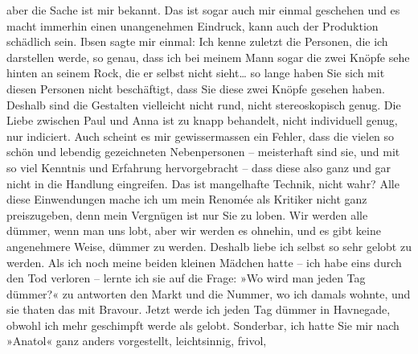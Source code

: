 \begin{ledgroupsized}[t]{13cm}
               aber die Sache ist mir bekannt. Das ist sogar auch mir einmal geschehen und es macht
               immerhin einen unangenehmen Eindruck, kann auch der Produktion schädlich sein. Ibsen sagte mir einmal: Ich kenne zuletzt die
               Personen, die ich darstellen werde, so genau, dass
               ich bei meinem Mann sogar die zwei Knöpfe sehe hinten an seinem Rock, die er selbst
               nicht sieht{\dots} so lange haben Sie sich mit diesen Personen
               nicht beschäftigt, dass Sie diese zwei Knöpfe gesehen haben. Deshalb sind die
               Gestalten vielleicht nicht rund, nicht stereoskopisch genug. Die Liebe zwischen Paul
               und Anna ist zu knapp behandelt, nicht individuell genug, nur indiciert. Auch scheint
               es mir gewissermassen ein Fehler, dass die vielen so schön und lebendig gezeichneten
               Nebenpersonen – meisterhaft sind sie, und mit so viel Kenntnis und Erfahrung
               hervorgebracht – dass diese also ganz und gar nicht in die Handlung eingreifen. Das
               ist mangelhafte Technik, nicht wahr?\pend
           \pstart
           Alle diese Einwendungen mache ich um mein Renomée als Kritiker nicht ganz
               preiszugeben, denn mein Vergnügen ist nur Sie zu loben. Wir werden alle dümmer, wenn
               man uns lobt, aber wir werden es ohnehin, und es gibt keine angenehmere Weise, dümmer
               zu werden. Deshalb liebe ich selbst so sehr gelobt zu werden. Als ich noch meine
               beiden kleinen Mädchen
               hatte – {\pb}ich habe eins durch den Tod verloren –
               lernte ich sie auf die Frage: »Wo wird man jeden Tag dümmer?« zu antworten den Markt
               und die Nummer, wo ich damals wohnte, und sie thaten das mit Bravour. Jetzt werde ich
               jeden Tag dümmer in Havnegade, obwohl ich mehr
               geschimpft werde als gelobt. Sonderbar, ich hatte Sie mir nach »Anatol« ganz anders vorgestellt, leichtsinnig, frivol,

\end{ledgroupsized}
